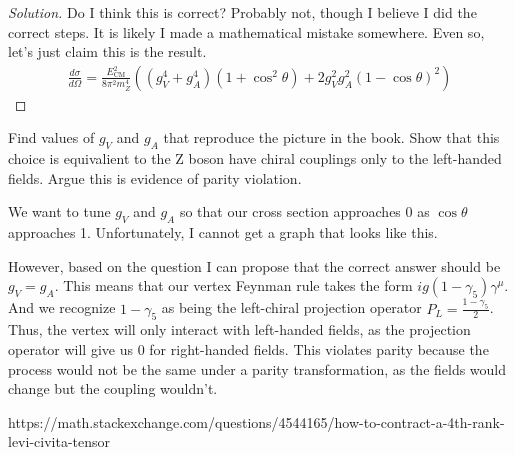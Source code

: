 \documentclass[12pt]{article}
\newenvironment{questionpart}[2][Part]{\begin{trivlist}
\item[\hskip \labelsep \hskip \labelsep {\bfseries (#2)}]}{\end{trivlist}}
\newenvironment{solution}{\begin{proof}[Solution]}{\end{proof}}
\begin{document}
\begin{solution}
Do I think this is correct? Probably not, though I believe I did the correct steps. It is likely I made a mathematical mistake somewhere. Even so, let's just claim this is the result.
\begin{align*}
    \boxed{\frac{d\sigma}{d\Omega}=\frac{E_\text{CM}^2}{8\pi^2 m_Z^4}\left((g_V^4+g_A^4)(1+\cos^2\theta)+2g_V^2g_A^2(1-\cos\theta)^2\right)}
\end{align*}

\end{solution}

\begin{questionpart}{c}
Find values of $g_V$ and $g_A$ that reproduce the picture in the book. Show that this choice is equivalient to the Z boson have chiral couplings only to the left-handed fields. Argue this is evidence of parity violation.
\end{questionpart}

We want to tune $g_V$ and $g_A$ so that our cross section approaches 0 as $\cos\theta$ approaches 1. Unfortunately, I cannot get a graph that looks like this.

However, based on the question I can propose that the correct answer should be $g_V=g_A$. This means that our vertex Feynman rule takes the form $ig(1-\gamma_5)\gamma^\mu$. And we recognize $1-\gamma_5$ as being the left-chiral projection operator $P_L=\frac{1-\gamma_5}{2}$. Thus, the vertex will only interact with left-handed fields, as the projection operator will give us 0 for right-handed fields.
This violates parity because the process would not be the same under a parity transformation, as the fields would change but the coupling wouldn't.

\newpage
[1] https://math.stackexchange.com/questions/4544165/how-to-contract-a-4th-rank-levi-civita-tensor
\end{document}
